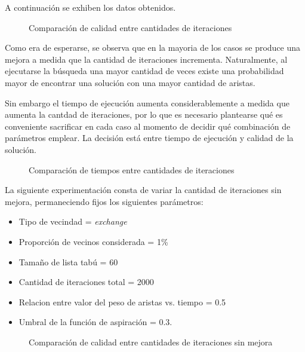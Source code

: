 A continuación se exhiben los datos obtenidos.

\begin{figure}[H]
    \centering
    \caption{Comparación de calidad entre cantidades de iteraciones}
    \pgfplotstabletypeset[
        columns={0, solutions, localsearch, lowiterationlowaspiration, highiterationlowaspiration, nolimititerationlowaspiration}
    ]{\optimalsolutions}
\end{figure}

Como era de esperarse, se observa que en la mayoria de los casos se produce
una mejora a medida que la cantidad de iteraciones incrementa. Naturalmente,
al ejecutarse la búsqueda una mayor cantidad de veces existe una probabilidad
mayor de encontrar una solución con una mayor cantidad de aristas.

Sin embargo el tiempo de ejecución aumenta considerablemente a medida que
aumenta la cantdad de iteraciones, por lo que es necesario plantearse qué
es conveniente sacrificar en cada caso al momento de decidir qué combinación
de parámetros emplear. La decisión está entre tiempo de ejecución y calidad de
la solución.

\begin{figure}[H]
    \centering
    \caption{Comparación de tiempos entre cantidades de iteraciones}
    \pgfplotstabletypeset[
        columns={0, localsearchtime, lowiterationlowaspirationtime, highiterationlowaspirationtime, nolimititerationlowaspirationtime}
    ]{\optimalsolutions}
\end{figure}

La siguiente experimentación consta de variar la cantidad de iteraciones
sin mejora, permaneciendo fijos los siguientes parámetros:

\begin{itemize}
\item Tipo de vecindad = \textit{exchange}
\item Proporción de vecinos considerada = 1\%
\item Tamaño de lista tabú = 60
\item Cantidad de iteraciones total = 2000
\item Relacion entre valor del peso de aristas vs. tiempo = 0.5
\item Umbral de la función de aspiración = 0.3.
\end{itemize}

\begin{figure}[H]
    \centering
    \caption{Comparación de calidad entre cantidades de iteraciones sin mejora}
    \pgfplotstabletypeset[
        columns={0, solutions, localsearch, highiterationlowernogainlowaspiration, highiterationhighnogainlowaspiration}
    ]{\optimalsolutions}
\end{figure}

